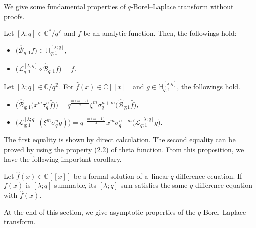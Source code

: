 We give some fundamental properties of $q$-Borel--Laplace transform without proofs.
\begin{Proposition} Let $[\lambda;q]\in\mathbb{C}^*/q^\mathbb{Z}$ and $f$ be an analytic function. Then, the followings hold:
\begin{itemize}\itemsep=0pt
\item $\big(\hat{\mathcal{B}}_{q;1}f\big)\in\mathbb{H}_{q;1}^{[\lambda;q]}$,
\item $\big(\mathcal{L}_{q;1}^{[\lambda;q]}\circ\hat{\mathcal{B}}_{q;1}f\big)=f$.
\end{itemize}
\end{Proposition}
\begin{Proposition}\label{prop_borel2} Let $[\lambda;q]\in\mathbb{C}/q^\mathbb{Z}$. For $\hat{f}(x)\in\mathbb{C}[[x]]$ and $g\in\mathbb{H}_{q;1}^{[\lambda;q]}$, the followings hold.
\begin{itemize}\itemsep=0pt
\item $\big(\hat{\mathcal{B}}_{q;1}\big(x^m\sigma_q^n\hat{f}\big)\big)=q^{\frac{m(m-1)}{2}}\xi^m\sigma_q^{n+m}\big(\hat{\mathcal{B}}_{q;1}\hat{f}\big)$,
\item $\big(\mathcal{L}_{q;1}^{[\lambda;q]}(\xi^m\sigma_q^ng)\big)=q^{-\frac{m(m-1)}{2}}x^m\sigma_q^{n-m}\big(\mathcal{L}_{q;1}^{[\lambda;q]}g\big)$.
\end{itemize}
\end{Proposition}
The first equality is shown by direct calculation. The second equality can be proved by using the property (2.2) of theta function. From this proposition, we have the following important corollary.
\begin{Corollary}\label{cor_q-diff}
Let $\hat{f}(x)\in\mathbb{C}[[x]]$ be a formal solution of a~linear $q$-difference equation. If $\hat{f}(x)$ is $[\lambda;q]$-summable, its $[\lambda;q]$-sum satisfies the same $q$-difference equation with $\hat{f}(x)$.
\end{Corollary}

At the end of this section, we give asymptotic properties of the $q$-Borel--Laplace transform.

